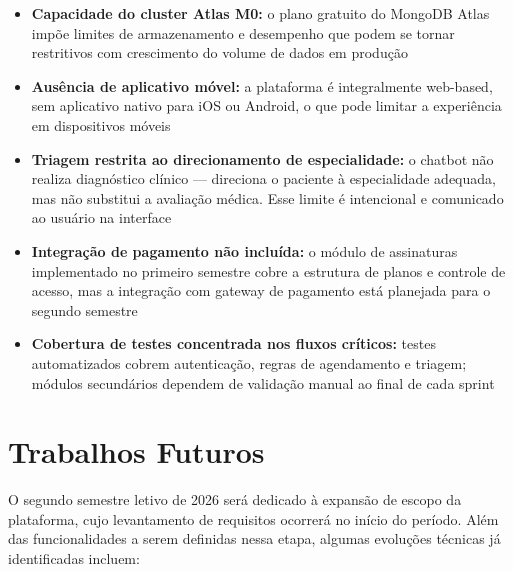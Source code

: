 \begin{itemize}
  \item \textbf{Capacidade do cluster Atlas M0:}
        o plano gratuito do MongoDB Atlas impõe limites
        de armazenamento e desempenho que podem se
        tornar restritivos com crescimento do volume
        de dados em produção

  \item \textbf{Ausência de aplicativo móvel:}
        a plataforma é integralmente web-based, sem
        aplicativo nativo para iOS ou Android, o que
        pode limitar a experiência em dispositivos
        móveis

  \item \textbf{Triagem restrita ao direcionamento
        de especialidade:} o chatbot não realiza
        diagnóstico clínico — direciona o paciente
        à especialidade adequada, mas não substitui
        a avaliação médica. Esse limite é
        intencional e comunicado ao usuário na
        interface

  \item \textbf{Integração de pagamento não incluída:}
        o módulo de assinaturas implementado no
        primeiro semestre cobre a estrutura de planos
        e controle de acesso, mas a integração com
        gateway de pagamento está planejada para o
        segundo semestre

  \item \textbf{Cobertura de testes concentrada nos
        fluxos críticos:} testes automatizados cobrem
        autenticação, regras de agendamento e triagem;
        módulos secundários dependem de validação
        manual ao final de cada sprint
\end{itemize}

\section{Trabalhos Futuros}
\label{sec:future-work}

O segundo semestre letivo de 2026 será dedicado à
expansão de escopo da plataforma, cujo levantamento
de requisitos ocorrerá no início do período. Além
das funcionalidades a serem definidas nessa etapa,
algumas evoluções técnicas já identificadas incluem:

